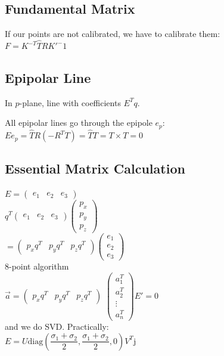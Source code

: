 \subsection*{Fundamental Matrix}
If our points are not calibrated, we have to calibrate them:\\
$F = K^{-T} \hat{T} R K'^-1$

\subsection*{Epipolar Line}
In $p$-plane, line with coefficients $E^T q$.

All epipolar lines go through the epipole $e_p$:\\
$E e_p = \hat{T} R (-R^T T) = \hat{T}T = T \times T = 0$

\subsection*{Essential Matrix Calculation}
$E = \begin{pmatrix}e_1 & e_2 & e_3 \end{pmatrix}$\\
$q^T \begin{pmatrix}e_1 & e_2 & e_3 \end{pmatrix}
\begin{pmatrix}p_x \\ p_y \\ p_z \end{pmatrix}$ \\
$= \begin{pmatrix}p_x q^T & p_y q^T&p_z q^T \end{pmatrix}
\begin{pmatrix}e_1 \\ e_2 \\ e_3 \end{pmatrix}$\\
8-point algorithm\\
$\vec{a} = \begin{pmatrix}p_x q^T & p_y q^T&p_z q^T \end{pmatrix}$
$\begin{pmatrix} a_1^T \\ a_2^T \\ \vdots \\ a_n^T \end{pmatrix} E' =
0$\\
and we do SVD. Practically: \\
$E = U \text{diag}\left(\dfrac{\sigma_1 + \sigma_2}{2}, \dfrac{\sigma_1
+ \sigma_2}{2}, 0 \right) V^T$j

